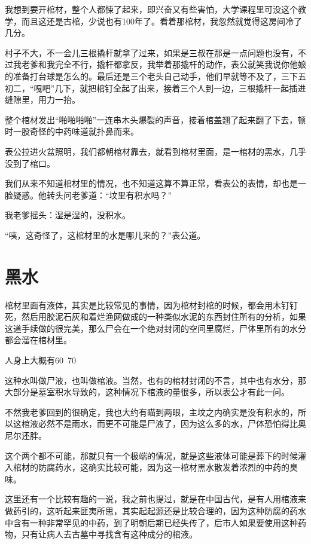 我想到要开棺材，整个人都悚了起来，即兴奋又有些害怕，大学课程里可没这个教学，而且这还是古棺，少说也有100年了。看着那棺材，我忽然就觉得这房间冷了几分。

村子不大，不一会儿三根撬杆就拿了过来，如果是三叔在那是一点问题也没有，不过我老爹和我完全不行，撬杆都拿反，我举着那撬杆的动作，表公就笑我说你他娘的准备打台球是怎么的。最后还是三个老头自己动手，他们早就等不及了，三下五初二，“嘎吧”几下，就把棺钉全起了出来，接着三个人到一边，三根撬杆一起插进缝隙里，用力一抬。

整个棺材发出“啪啪啪啪”一连串木头爆裂的声音，接着棺盖翘了起来翻了下去，顿时一股奇怪的中药味道就扑鼻而来。

表公拉进火盆照明，我们都朝棺材靠去，就看到棺材里面，是一棺材的黑水，几乎没到了棺口。

我们从来不知道棺材里的情况，也不知道这算不算正常，看表公的表情，却也是一脸疑惑。他转头问老爹道：“坟里有积水吗？”

我老爹摇头：湿是湿的，没积水。

“咦，这奇怪了，这棺材里的水是哪儿来的？”表公道。

\chapter{黑水}

棺材里面有液体，其实是比较常见的事情，因为棺材封棺的时候，都会用木钉钉死，然后用胶泥石灰和着烂渔网做成的一种类似水泥的东西封住所有的分析，如果这道手续做的很完美，那么尸会在一个绝对封闭的空间里腐烂，尸体里所有的水分都会溜在棺材里。

人身上大概有60~70%

这种水叫做尸液，也叫做棺液。当然，也有的棺材封闭的不言，其中也有水分，那大部分是墓室积水导致的，这种情况下棺液的量很多，所以表公才有此一问。

不然我老爹回到的很确定，我也大约有瞄到两眼，主坟之内确实是没有积水的，所以这棺液必然不是雨水，而更不可能是尸液了，因为这么多的水，尸体恐怕得比奥尼尔还胖。

这个两个都不可能，那就只有一个极端的情况，就是这些液体可能是葬下的时候灌入棺材的防腐药水，这确实比较可能，因为这一棺材黑水散发着浓烈的中药的臭味。

这里还有一个比较有趣的一说，我之前也提过，就是在中国古代，是有人用棺液来做药引的，这听起来匪夷所思，其实起起源还是比较合理的，因为这种防腐的药水中含有一种非常罕见的中药，到了明朝后期已经失传了，后市人如果要使用这种药物，只有让病人去古墓中寻找含有这种成分的棺液。

